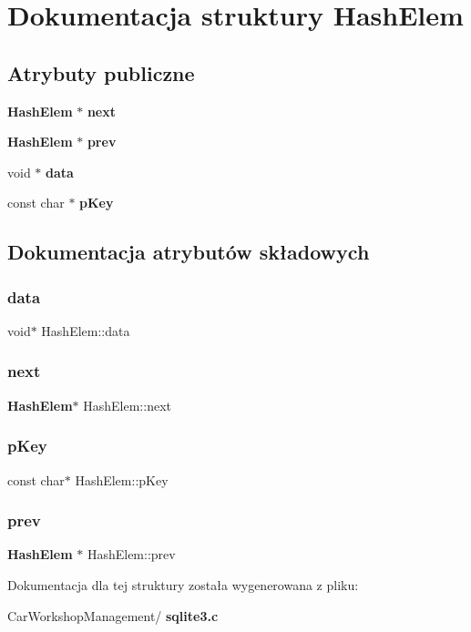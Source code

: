 \section{Dokumentacja struktury Hash\+Elem}
\label{struct_hash_elem}
\subsection*{Atrybuty publiczne}
\begin{DoxyCompactItemize}
\item 
\textbf{ Hash\+Elem} $\ast$ \textbf{ next}
\item 
\textbf{ Hash\+Elem} $\ast$ \textbf{ prev}
\item 
void $\ast$ \textbf{ data}
\item 
const char $\ast$ \textbf{ p\+Key}
\end{DoxyCompactItemize}


\subsection{Dokumentacja atrybutów składowych}
\mbox{\label{struct_hash_elem_ac7e80f63ba2f82457ff68aa0cd360365}} 
\subsubsection{data}
{\footnotesize\ttfamily void$\ast$ Hash\+Elem\+::data}

\mbox{\label{struct_hash_elem_a2d28fad45ff21ffb8a02a7133df860fd}} 
\subsubsection{next}
{\footnotesize\ttfamily \textbf{ Hash\+Elem}$\ast$ Hash\+Elem\+::next}

\mbox{\label{struct_hash_elem_a9c33a7c8ac467a5547a123338daf61f4}} 
\subsubsection{pKey}
{\footnotesize\ttfamily const char$\ast$ Hash\+Elem\+::p\+Key}

\mbox{\label{struct_hash_elem_ae4d011c0dc807a3c100ccdb927dd0ba9}} 
\subsubsection{prev}
{\footnotesize\ttfamily \textbf{ Hash\+Elem} $\ast$ Hash\+Elem\+::prev}



Dokumentacja dla tej struktury została wygenerowana z pliku\+:\begin{DoxyCompactItemize}
\item 
Car\+Workshop\+Management/\textbf{ sqlite3.\+c}\end{DoxyCompactItemize}
